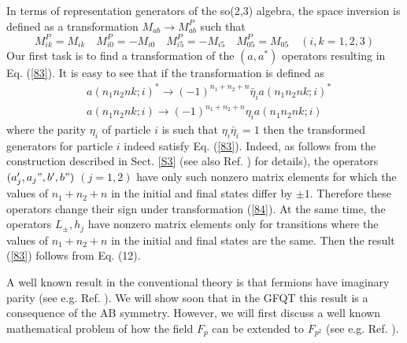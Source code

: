 \documentclass[a4paper,12pt]{article}%
\begin{document}
In terms of representation generators of the so(2,3)
algebra, the space inversion is defined as a
transformation $M_{ab}\rightarrow M_{ab}^P$ such that
\begin{equation}
M_{ik}^P=M_{ik}\quad M_{i0}^P=-M_{i0} \quad 
M_{i5}^P=-M_{i5}\quad M_{05}^P=M_{05}\quad (i,k=1,2,3) 
\label{83}
\end{equation}
Our first task is to find a transformation of the
$(a,a^*)$ operators resulting in Eq. (\ref{83}).
It is easy to see that if the transformation is defined as 
\begin{eqnarray}
&a(n_1n_2nk;i)^*\rightarrow (-1)^{n_1+n_2+n}{\bar\eta}_i 
a(n_1n_2nk;i)^*\nonumber\\
&a(n_1n_2nk;i)\rightarrow (-1)^{n_1+n_2+n}\eta_i 
a(n_1n_2nk;i)
\label{84}
\end{eqnarray}
where the parity $\eta_i$ of particle $i$ is such that
$\eta_i{\bar\eta}_i=1$ then the transformed generators
for particle $i$ indeed satisfy Eq. (\ref{83}). Indeed,
as follows from the construction described in Sect. 
\ref{S3} (see also Ref. \cite{lev3}) for details),
the operators $(a_j',a_j",b',b")$ $(j=1,2)$ have only
such nonzero matrix elements for which the values of 
$n_1+n_2+n$ in the initial and final states differ by
$\pm 1$. Therefore these operators change their sign
under transformation (\ref{84}). At the same time, the
operators $L_{\pm},h_j$ have nonzero matrix elements
only for transitions where the values of $n_1+n_2+n$
in the initial and final states are the same. 
Then the result (\ref{83}) follows from Eq. (12).

A well known result in the conventional theory is that
fermions have imaginary parity (see e.g. Ref. 
\cite{Wein-super}). We will show soon that in 
the GFQT this result is a consequence of the AB symmetry. 
However, we will first discuss a well known mathematical
problem of how the field $F_p$ can be extended to 
$F_{p^2}$ (see e.g. Ref. \cite{VDW}).
\end{document}

